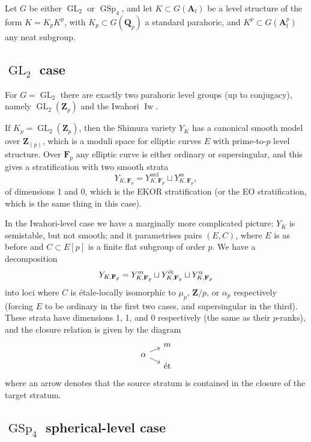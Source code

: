 \documentclass[cjm]{ipart}
\theoremstyle{plain}
\theoremstyle{remark}
\DeclareMathOperator{\GL}{GL}
\DeclareMathOperator{\GSp}{GSp}
\DeclareMathOperator{\Iw}{Iw}
\DeclareMathOperator{\ord}{ord}
\newcommand{\Af}{\AA_{\mathrm{f}}}
\newcommand{\Fp}{\mathbf{F}_p}
\newcommand{\QQ}{\mathbf{Q}}
\newcommand{\Qp}{\QQ_p}
\newcommand{\ZZ}{\mathbf{Z}}
\newcommand{\Zp}{\mathbf{Z}_p}
\newcommand{\et}{\text{\textup{\'et}}}
\renewcommand{\AA}{\mathbf{A}}
\numberwithin{equation}{subsection}
\begin{document}
 Let $G$ be either $\GL_2$ or $\GSp_4$, and let $K \subset G(\Af)$ be a level structure of the form $K = K_p K^p$, with $K_p \subset G(\Qp)$ a standard parahoric, and $K^p \subset G(\Af^p)$ any neat subgroup.

 \subsection{$\GL_2$ case}

  For $G = \GL_2$ there are exactly two parahoric level groups (up to conjugacy), namely $\GL_2(\Zp)$ and the Iwahori $\Iw$.

  If $K_p = \GL_2(\Zp)$, then the Shimura variety $Y_K$ has a canonical smooth model over $\ZZ_{(p)}$, which is a moduli space for elliptic curves $E$ with prime-to-$p$ level structure. Over $\Fp$ any elliptic curve is either ordinary or supersingular, and this gives a stratification with two smooth strata
  \[ Y_{K, \Fp} = Y_{K, \Fp}^{\ord} \sqcup Y_{K, \Fp}^{\mathrm{ss}}, \]
  of dimensions 1 and 0, which is the EKOR stratification (or the EO stratification, which is the same thing in this case).

  In the Iwahori-level case we have a marginally more complicated picture: $Y_K$ is semistable, but not smooth; and it parametrises pairs $(E, C)$, where $E$ is as before and $C \subset E[p]$ is a finite flat subgroup of order $p$. We have a decomposition
  \[ Y_{K, \Fp} = Y_{K, \Fp}^{m} \sqcup Y_{K, \Fp}^{\et} \sqcup Y_{K, \Fp}^{\alpha}\]
  into loci where $C$ is \'etale-locally isomorphic to $\mu_p$, $\ZZ/p$, or $\alpha_p$ respectively (forcing $E$ to be ordinary in the first two cases, and supersingular in the third). These strata have dimensions 1, 1, and 0 respectively (the same as their $p$-ranks), and the closure relation is given by the diagram
  \[
   \begin{tikzcd}[column sep=small, row sep=0pt]
             & m \\
     \alpha\ar[ru]\ar[rd] & \\
             & \et
   \end{tikzcd}
  \]
  where an arrow denotes that the source stratum is contained in the closure of the target stratum.

 \subsection{$\GSp_4$ spherical-level case}
\end{document}
